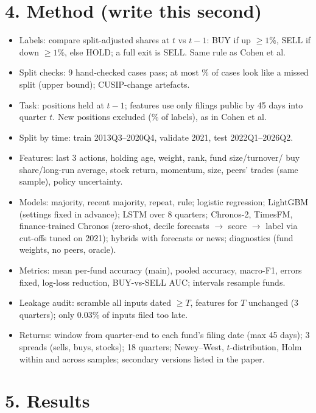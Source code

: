 \documentclass[11pt]{article}
\begin{document}
\section*{4. Method (write this second)}
\begin{itemize}
  \item Labels: compare split-adjusted shares at $t$ vs $t-1$: BUY if up $\ge1\%$,
  SELL if down $\ge1\%$, else HOLD; a full exit is SELL. Same rule as Cohen et al.
  \item Split checks: 9 hand-checked cases pass; at most \splitlikepct\% of cases
  look like a missed split (upper bound); \cusipchangen{} CUSIP-change artefacts.
  \item Task: positions held at $t-1$; features use only filings public by 45 days
  into quarter $t$. New positions excluded (\newM\% of labels), as in Cohen et al.
  \item Split by time: train 2013Q3--2020Q4, validate 2021, test 2022Q1--2026Q2.
  \item Features: last 3 actions, holding age, weight, rank, fund size/turnover/
  buy share/long-run average, stock return, momentum, size, peers' trades (same
  sample), policy uncertainty.
  \item Models: majority, recent majority, repeat, rule; logistic regression;
  LightGBM (settings fixed in advance); LSTM over 8 quarters; Chronos-2, TimesFM,
  finance-trained Chronos (zero-shot, decile forecasts $\to$ score $\to$ label via
  cut-offs tuned on 2021); hybrids with forecasts or news; diagnostics (fund
  weights, no peers, oracle).
  \item Metrics: mean per-fund accuracy (main), pooled accuracy, macro-F1, errors
  fixed, log-loss reduction, BUY-vs-SELL AUC; intervals resample funds.
  \item Leakage audit: scramble all inputs dated $\ge T$, features for $T$ unchanged
  (3 quarters); only 0.03\% of inputs filed too late.
  \item Returns: window from quarter-end to each fund's filing date (max 45 days);
  3 spreads (sells, buys, stocks); 18 quarters; Newey--West, $t$-distribution,
  Holm within and across samples; secondary versions listed in the paper.
\end{itemize}

\section*{5. Results}
\end{document}
